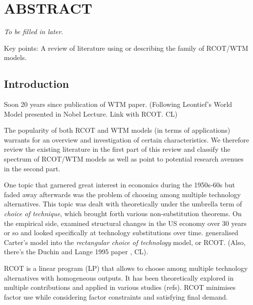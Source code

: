 \documentclass{article}
\begin{document}

\frontmatter

\mainmatter
\linenumbers

{\huge{\multiTitle}}

\section*{ABSTRACT}
\emph{To be filled in later}.

Key points: A review of literature using or describing the family of RCOT/WTM models.

\begin{refsection}

\section{Introduction}

Soon 20 years since publication of WTM paper. (Following Leontief's World Model presented in Nobel Lecture. Link with RCOT. CL)

The popularity of both RCOT and WTM models (in terms of applications) warrants for an overview and investigation of certain characteristics. We therefore review the existing literature in the first part of this review and classify the spectrum of RCOT/WTM models as well as point to potential research avenues in the second part. 

One topic that garnered great interest in economics during the 1950s-60s but faded away afterwards was the problem of choosing among multiple technology alternatives. This topic was dealt with theoretically under the umbrella term of \textit{choice of technique}, which brought forth various non-substitution theorems. On the empirical side, \textcite{carter1970} examined structural changes in the US economy over 30 years or so and looked specifically at technology substitutions over time. \textcite{duchin_2011} generalised Carter's model into the \textit{rectangular choice of technology} model, or RCOT. (Also, there's the Duchin and Lange 1995 paper \textcite{duchin1995choice}, CL).

RCOT is a linear program (LP) that allows to choose among multiple technology alternatives with homogeneous outputs. It has been theoretically explored in multiple contributions \parencite{duchin_2017,steenge_2019,duchin_2012} and applied in various studies (refs). RCOT minimises factor use while considering factor constraints and satisfying final demand.


\end{refsection}
\end{document}
